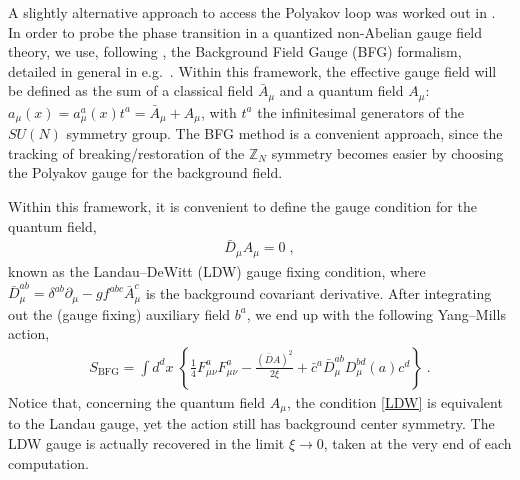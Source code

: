 A slightly alternative approach to access the Polyakov loop was worked out in
\cite{Reinosa:2014ooa}.
In order to probe the phase transition in a quantized non-Abelian gauge
field theory, we use, following \cite{Reinosa:2014ooa}, the Background Field Gauge (BFG)
formalism, detailed in general in e.g.~\cite{Weinberg:1996kr}. Within this framework, the
effective gauge field will be defined as the sum of a classical field $\bar{A}_{\mu}$ and a
quantum field $A_{\mu}$: $a_{\mu}(x) = a_{\mu}^{a}(x)t^{a} = \bar{A}_{\mu}+A_{\mu}
$, with $t^{a}$  the infinitesimal generators of the
$SU(N)$ symmetry group. The BFG method is a convenient approach, since the
tracking of breaking/restoration of the $\mathbb{Z}_{N}$ symmetry becomes
easier by choosing the Polyakov gauge for the background field.

Within this framework, it is convenient to define the gauge condition for the quantum field,
\begin{eqnarray}
\bar{D}_{\mu}A_{\mu} = 0\;,  \label{LDW}
\end{eqnarray}
 known as the Landau--DeWitt (LDW) gauge fixing condition, where $\bar{D}%
^{ab}_{\mu} =\delta^{ab}\partial_{\mu} - gf^{abc}\bar{A}^{c}_{\mu}$ is the
background covariant derivative. After integrating out the (gauge fixing)
auxiliary field $b^{a}$, we end up with the following Yang--Mills action,
\begin{eqnarray}
S_\text{BFG} = \int d^{d}x\; \left\{ \frac{1}{4}F^{a}_{\mu\nu}F^{a}_{\mu\nu}
- \frac{\left( \bar{D}A \right)^{2}}{2\xi} + \bar{c}^{a}\bar{D}_{\mu}^{ab}
D^{bd}_{\mu}(a)c^{d} \right\} \;.  \label{bfg}
\end{eqnarray}
Notice that, concerning the quantum field $A_{\mu}$, the condition %
\eqref{LDW} is equivalent to the Landau gauge, yet the action still has  background center symmetry. The LDW gauge is actually recovered in the limit
$\xi \to 0$, taken at the very end of each computation.

